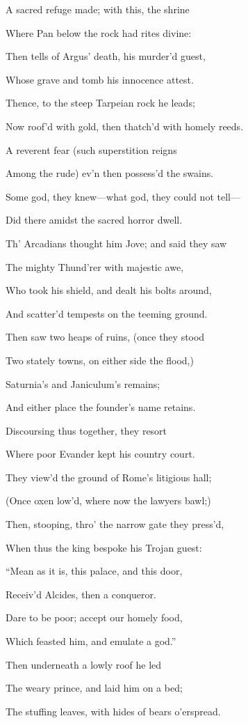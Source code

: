A sacred refuge made; with this, the shrine

Where Pan below the rock had rites divine:

Then tells of Argus’ death, his murder’d guest,

Whose grave and tomb his innocence attest.

Thence, to the steep Tarpeian rock he leads;

Now roof’d with gold, then thatch’d with homely reeds.

A reverent fear (such superstition reigns

Among the rude) ev’n then possess’d the swains.

Some god, they knew—what god, they could not tell—

Did there amidst the sacred horror dwell.

Th’ Arcadians thought him Jove; and said they saw

The mighty Thund’rer with majestic awe,

Who took his shield, and dealt his bolts around,

And scatter’d tempests on the teeming ground.

Then saw two heaps of ruins, (once they stood

Two stately towns, on either side the flood,)

Saturnia’s and Janiculum’s remains;

And either place the founder’s name retains.

Discoursing thus together, they resort

Where poor Evander kept his country court.

They view’d the ground of Rome’s litigious hall;

(Once oxen low’d, where now the lawyers bawl;)

Then, stooping, thro’ the narrow gate they press’d,

When thus the king bespoke his Trojan guest:

“Mean as it is, this palace, and this door,

Receiv’d Alcides, then a conqueror.

Dare to be poor; accept our homely food,

Which feasted him, and emulate a god.”

Then underneath a lowly roof he led

The weary prince, and laid him on a bed;

The stuffing leaves, with hides of bears o’erspread.

